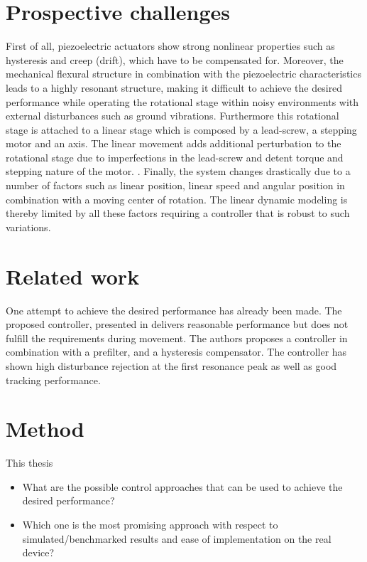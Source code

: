 \section{Prospective challenges}\label{sec:prospectiveChallanges}
First of all, piezoelectric actuators show strong nonlinear properties such as hysteresis and creep (drift), which have to be compensated for.\citep{Piezo:2008} Moreover, the mechanical flexural structure in combination with the piezoelectric characteristics leads to a highly resonant structure, making it difficult to achieve the desired performance while operating the rotational stage within noisy environments with external disturbances such as ground vibrations. Furthermore this rotational stage is attached to a linear stage which is composed by a lead-screw, a stepping motor and an axis. The linear movement adds additional perturbation to the rotational stage due to imperfections in the lead-screw and detent torque and stepping nature of the motor. \citep{ButcherController:2015}. Finally, the system changes drastically due to a number of factors such as linear position, linear speed and angular position in combination with a moving center of rotation. The linear dynamic modeling is thereby limited by all these factors requiring a controller that is robust to such variations.

\section{Related work}

One attempt to achieve the desired performance has already been made. The proposed controller, presented in \citep{ButcherController:2015} delivers reasonable performance but does not fulfill the requirements during movement. The authors proposes a \abbrPID controller in combination with a prefilter, and a hysteresis compensator. The controller has shown high disturbance rejection at the first resonance peak as well as good tracking performance.

\section{Method}
This thesis


\begin{itemize}
  \item What are the possible control approaches that can be used to achieve the desired performance?
  \item Which one is the most promising approach with respect to simulated/benchmarked results and ease of implementation on the real device?
\end{itemize}

